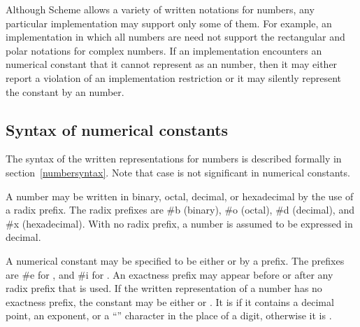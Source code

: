 Although Scheme allows a variety of written
notations for
numbers, any particular implementation may support only some of them.
For example, an implementation in which all numbers are 
need not support the rectangular and polar notations for complex
numbers.  If an implementation encounters an  numerical constant that
it cannot represent as an  number, then it may either report a
violation of an implementation restriction or it may silently represent the
constant by an  number.


\subsection{Syntax of numerical constants}
\label{numbernotations}


%

The syntax of the written representations for numbers is described formally in
section~\ref{numbersyntax}.  Note that case is not significant in numerical
constants.


A number may be written in binary, octal, decimal, or
hexadecimal by the use of a radix prefix.  The radix prefixes are {\cf
\#b} (binary), {\cf \#o} (octal), {\cf
\#d} (decimal), and {\cf \#x} (hexadecimal).  With
no radix prefix, a number is assumed to be expressed in decimal.

A
numerical constant may be specified to be either  or
 by a prefix.  The prefixes are {\cf \#e}
for , and {\cf \#i} for .  An exactness
prefix may appear before or after any radix prefix that is used.  If
the written representation of a number has no exactness prefix, the
constant may be either  or .  It is
 if it contains a decimal point, an
exponent, or a ``\sharpsign'' character in the place of a digit,
otherwise it is .
%

